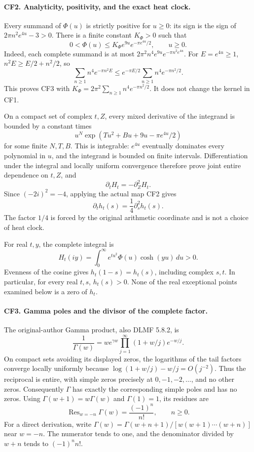 \paragraph{CF2. Analyticity, positivity, and the exact heat clock.}
Every summand of \(\Phi(u)\) is strictly positive for \(u\ge0\):
its sign is the sign of \(2\pi n^2e^{4u}-3>0\).
There is a finite constant \(K_\Phi>0\) such that
\[
 0<\Phi(u)\le K_\Phi e^{9u}e^{-\pi e^{4u}/2},
 \qquad u\ge0.
 \tag{CF3}
\]
Indeed, each complete summand is at most
\(2\pi^2n^4e^{9u}e^{-\pi n^2e^{4u}}\).
For \(E=e^{4u}\ge1\),
\(n^2E\ge E/2+n^2/2\), so
\[
 \sum_{n\ge1}n^4e^{-\pi n^2E}
 \le e^{-\pi E/2}\sum_{n\ge1}n^4e^{-\pi n^2/2}.
\]
This proves CF3 with
\(K_\Phi=2\pi^2\sum_{n\ge1}n^4e^{-\pi n^2/2}\).
It does not change the kernel in CF1.

On a compact set of complex \(t,Z\), every mixed derivative
of the integrand is bounded by a constant times
\[
 u^N\exp(Tu^2+Bu+9u-\pi e^{4u}/2)
\]
for some finite \(N,T,B\). This is integrable: \(e^{4u}\)
eventually dominates every polynomial in \(u\), and the
integrand is bounded on finite intervals. Differentiation
under the integral and locally uniform convergence therefore
prove joint entire dependence on \(t,Z\), and
\[
 \partial_tH_t=-\partial_Z^2H_t.
\]
Since \((-2i)^2=-4\), applying the actual map CF2 gives
\[
 \partial_t h_t(s)=\frac14\partial_s^2h_t(s).
 \tag{CF4}
\]
The factor \(1/4\) is forced by the original arithmetic
coordinate and is not a choice of heat clock.

For real \(t,y\), the complete integral is
\[
 H_t(iy)=\int_0^\infty e^{tu^2}\Phi(u)\cosh(yu)\,du>0.
 \tag{CF5}
\]
Evenness of the cosine gives \(h_t(1-s)=h_t(s)\), including
complex \(s,t\). In particular, for every real \(t,s\),
\(h_t(s)>0\). None of the real exceptional points examined
below is a zero of \(h_t\).

\paragraph{CF3. Gamma poles and the divisor of the complete factor.}
The original-author Gamma product, also DLMF 5.8.2, is
\[
 \frac1{\Gamma(w)}
 =we^{\gamma w}\prod_{j=1}^{\infty}
       (1+w/j)e^{-w/j}.
 \tag{CF6}
\]
On compact sets avoiding its displayed zeros, the logarithms
of the tail factors converge locally uniformly because
\(\log(1+w/j)-w/j=O(j^{-2})\). Thus the reciprocal is
entire, with simple zeros precisely at
\(0,-1,-2,\ldots\), and no other zeros. Consequently
\(\Gamma\) has exactly the corresponding simple poles and
has no zeros. Using
\(\Gamma(w+1)=w\Gamma(w)\) and \(\Gamma(1)=1\), its
residues are
\[
 \operatorname{Res}_{w=-n}\Gamma(w)=\frac{(-1)^n}{n!},
 \qquad n\ge0.
 \tag{CF7}
\]
For a direct derivation, write
\(\Gamma(w)=\Gamma(w+n+1)/[w(w+1)\cdots(w+n)]\)
near \(w=-n\). The numerator tends to one, and the
denominator divided by \(w+n\) tends to \((-1)^n n!\).


